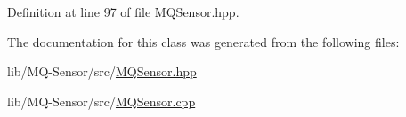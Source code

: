 Definition at line 97 of file M\+Q\+Sensor.\+hpp.



The documentation for this class was generated from the following files\+:\begin{DoxyCompactItemize}
\item 
lib/\+M\+Q-\/\+Sensor/src/\hyperlink{_m_q_sensor_8hpp}{M\+Q\+Sensor.\+hpp}\item 
lib/\+M\+Q-\/\+Sensor/src/\hyperlink{_m_q_sensor_8cpp}{M\+Q\+Sensor.\+cpp}\end{DoxyCompactItemize}
